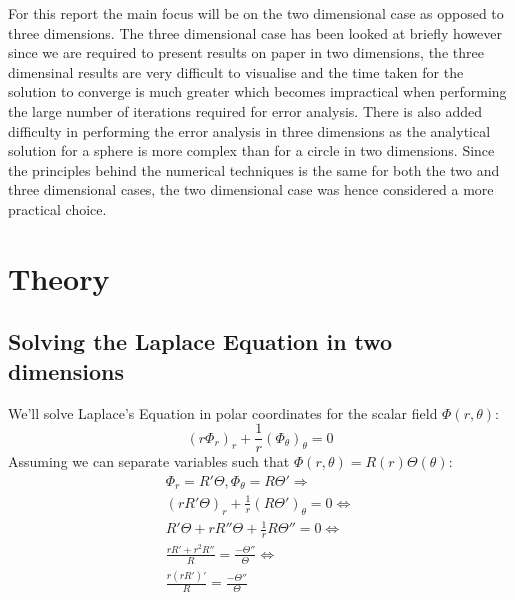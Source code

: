 \documentclass[aps,twocolumn,pre,nofootinbib,10pt]{revtex4-1}
\begin{document}
For this report the main focus will be on the two dimensional case as opposed to three dimensions. The three dimensional case has been looked at briefly however since we are required to present results on paper in two dimensions, the three dimensinal results are very difficult to visualise and the time taken for the solution to converge is much greater which becomes impractical when performing the large number of iterations required for error analysis. There is also added difficulty in performing the error analysis in three dimensions as the analytical solution for a sphere is more complex than for a circle in two dimensions. Since the principles behind the numerical techniques is the same for both the two and three dimensional cases, the two dimensional case was hence considered a more practical choice.


\section{Theory \label{sec:the}}

\subsection{Solving the Laplace Equation in two dimensions}
We'll solve Laplace's Equation in polar coordinates for the scalar field $\Phi(r, \theta)$:
\[ \left( r \Phi_r \right)_r + \frac{1}{r} \left(\Phi_\theta \right)_\theta = 0 \]
Assuming we can separate variables such that $\Phi(r, \theta) = R(r)\Theta(\theta)$:
\begin{gather*}
 \Phi_r = R'\Theta, \Phi_\theta = R\Theta' \Rightarrow \\
 (rR'\Theta)_r + \frac{1}{r}(R\Theta')_\theta = 0 \Leftrightarrow \\
 R'\Theta + rR''\Theta + \frac{1}{r}R\Theta'' = 0 \Leftrightarrow \\
 \frac{rR' + r^2 R''}{R} = \frac{- \Theta''}{\Theta} \Leftrightarrow \\
 \frac{r(rR')'}{R} = \frac{- \Theta''}{\Theta}
\end{gather*}
\end{document}
